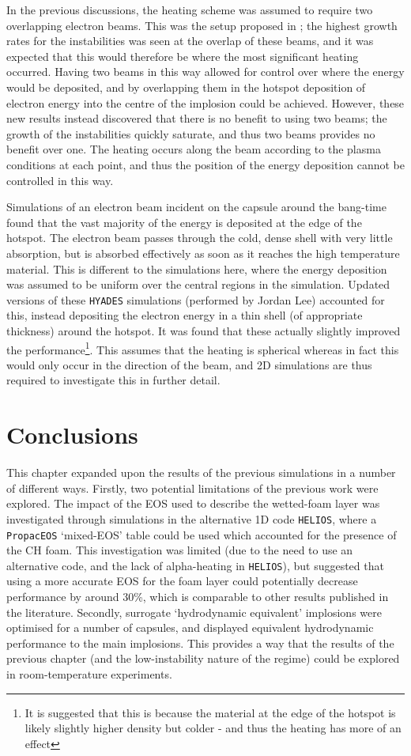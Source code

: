 In the previous discussions, the heating scheme was assumed to require two overlapping electron beams. This was the setup proposed in \cite{Ratan2017}; the highest growth rates for the instabilities was seen at the overlap of these beams, and it was expected that this would therefore be where the most significant heating occurred. Having two beams in this way allowed for control over where the energy would be deposited, and by overlapping them in the hotspot deposition of electron energy into the centre of the implosion could be achieved. However, these new results instead discovered that there is no benefit to using two beams; the growth of the instabilities quickly saturate, and thus two beams provides no benefit over one. The heating occurs along the beam according to the plasma conditions at each point, and thus the position of the energy deposition cannot be controlled in this way.

Simulations of an electron beam incident on the capsule around the bang-time found that the vast majority of the energy is deposited at the edge of the hotspot. The electron beam passes through the cold, dense shell with very little absorption, but is absorbed effectively as soon as it reaches the high temperature material. This is different to the simulations here, where the energy deposition was assumed to be uniform over the central regions in the simulation. Updated versions of these \texttt{HYADES} simulations (performed by Jordan Lee) accounted for this, instead depositing the electron energy in a thin shell (of appropriate thickness) around the hotspot. It was found that these actually slightly improved the performance\footnote{It is suggested that this is because the material at the edge of the hotspot is likely slightly higher density but colder - and thus the heating has more of an effect}. This assumes that the heating is spherical whereas in fact this would only occur in the direction of the beam, and 2D simulations are thus required to investigate this in further detail.

\section{Conclusions}
This chapter expanded upon the results of the previous simulations in a number of different ways. Firstly, two potential limitations of the previous work were explored. The impact of the EOS used to describe the wetted-foam layer was investigated through simulations in the alternative 1D code \texttt{HELIOS}, where a \texttt{PropacEOS} `mixed-EOS' table could be used which accounted for the presence of the CH foam. This investigation was limited (due to the need to use an alternative code, and the lack of alpha-heating in \texttt{HELIOS}), but suggested that using a more accurate EOS for the foam layer could potentially decrease performance by around 30\%, which is comparable to other results published in the literature. Secondly, surrogate `hydrodynamic equivalent' implosions were optimised for a number of capsules, and displayed equivalent hydrodynamic performance to the main implosions. This provides a way that the results of the previous chapter (and the low-instability nature of the regime) could be explored in room-temperature experiments.

